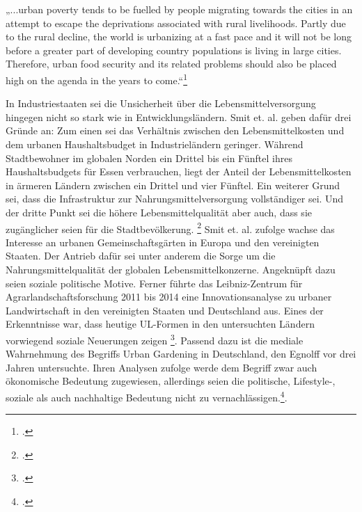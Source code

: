 \documentclass{scrartcl}
\begin{document}
\begin{displayquote}
„\lbrack...\rbrack urban poverty tends to be fuelled by people migrating towards the cities in an attempt to escape the deprivations associated with rural livelihoods. Partly due to the rural decline, the world is urbanizing at a fast pace and it will not be long before a greater part of developing country populations is living in large cities. Therefore, urban food security and its related problems should also be placed high on the agenda in the years to come.“\footcite[S.5f]{FoodandAgricultureOrganizationoftheUnitedNations2006The2006}
\end{displayquote}
In Industriestaaten sei die Unsicherheit über die Lebensmittelversorgung hingegen nicht so stark wie in Entwicklungsländern. Smit et. al. geben dafür drei Gründe an: Zum einen sei das Verhältnis zwischen den Lebensmittelkosten und dem urbanen Haushaltsbudget in Industrieländern geringer. Während Stadtbewohner im globalen Norden ein Drittel bis ein Fünftel ihres Haushaltsbudgets für Essen verbrauchen, liegt der Anteil der Lebensmittelkosten in ärmeren Ländern zwischen ein Drittel und vier Fünftel. Ein weiterer Grund sei, dass die Infrastruktur zur Nahrungsmittelversorgung vollständiger sei. Und der dritte Punkt sei die höhere Lebensmittelqualität aber auch, dass sie zugänglicher seien für die Stadtbevölkerung. \footcites[Vgl.][S.27]{Smit2001UrbanToday} Smit et. al. zufolge wachse das Interesse an urbanen Gemeinschaftsgärten in Europa und den vereinigten Staaten. Der Antrieb dafür sei unter anderem die Sorge um die Nahrungsmittelqualität der globalen Lebensmittelkonzerne. Angeknüpft dazu seien soziale politische Motive. Ferner führte das Leibniz-Zentrum für Agrarlandschaftsforschung 2011 bis 2014 eine Innovationsanalyse zu urbaner Landwirtschaft in den vereinigten Staaten und Deutschland aus. Eines der Erkenntnisse war, dass heutige UL-Formen in den untersuchten Ländern vorwiegend soziale Neuerungen zeigen \footcite{Berges2014UrbaneStadt}. Passend dazu ist die mediale Wahrnehmung des Begriffs Urban Gardening in Deutschland, den Egnolff vor drei Jahren untersuchte. Ihren Analysen zufolge werde dem Begriff zwar auch ökonomische Bedeutung zugewiesen, allerdings seien die politische, Lifestyle-, soziale als auch nachhaltige Bedeutung nicht zu vernachlässigen.\footcite[Vgl.][S.119ff]{Egnolff2015DieIdeal}. 

\end{document}
